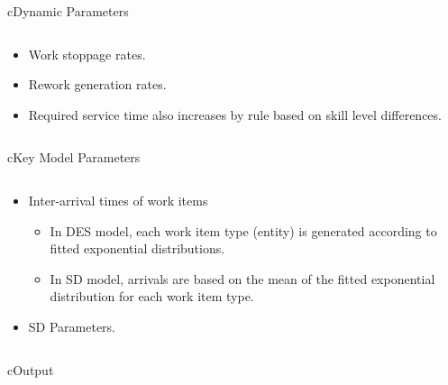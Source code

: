 \begin{myslide}{c}{Dynamic Parameters}

\begin{columns}

\begin{column}{1\textwidth}

\begin{itemize}

\item Work stoppage rates.

\item Rework generation rates.

\item Required service time also increases by rule based on skill level differences.

\end{itemize}

\end{column}

\end{columns}

\end{myslide}

\begin{myslide}{c}{Key Model Parameters}

\begin{columns}

\begin{column}{1\textwidth}

\begin{itemize}

\item Inter-arrival times of work items

    \begin{itemize}
    \item In DES model, each work item type (entity) is generated according to fitted exponential distributions.
    \item In SD model, arrivals are based on the mean of the fitted exponential distribution for each work item type.
    \end{itemize}

\item SD Parameters.

\end{itemize}

\end{column}

\end{columns}

\end{myslide}

\begin{myslide}{c}{Output}

\begin{columns}

\begin{column}{1\textwidth}



\end{column}

\end{columns}

\end{myslide}